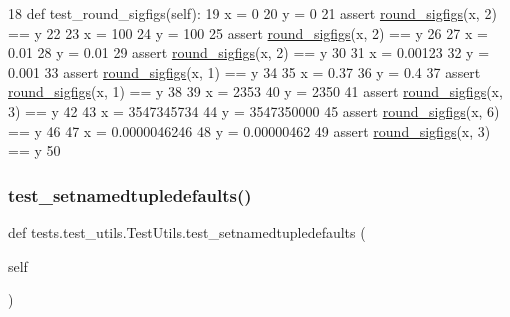 \begin{DoxyCode}
18     \textcolor{keyword}{def }test\_round\_sigfigs(self):
19         x = 0
20         y = 0
21         \textcolor{keyword}{assert} \hyperlink{namespaceparlai_1_1agents_1_1legacy__agents_1_1seq2seq_1_1utils__v0_af377ec61bfc0423461e7b409ffc883b9}{round\_sigfigs}(x, 2) == y
22 
23         x = 100
24         y = 100
25         \textcolor{keyword}{assert} \hyperlink{namespaceparlai_1_1agents_1_1legacy__agents_1_1seq2seq_1_1utils__v0_af377ec61bfc0423461e7b409ffc883b9}{round\_sigfigs}(x, 2) == y
26 
27         x = 0.01
28         y = 0.01
29         \textcolor{keyword}{assert} \hyperlink{namespaceparlai_1_1agents_1_1legacy__agents_1_1seq2seq_1_1utils__v0_af377ec61bfc0423461e7b409ffc883b9}{round\_sigfigs}(x, 2) == y
30 
31         x = 0.00123
32         y = 0.001
33         \textcolor{keyword}{assert} \hyperlink{namespaceparlai_1_1agents_1_1legacy__agents_1_1seq2seq_1_1utils__v0_af377ec61bfc0423461e7b409ffc883b9}{round\_sigfigs}(x, 1) == y
34 
35         x = 0.37
36         y = 0.4
37         \textcolor{keyword}{assert} \hyperlink{namespaceparlai_1_1agents_1_1legacy__agents_1_1seq2seq_1_1utils__v0_af377ec61bfc0423461e7b409ffc883b9}{round\_sigfigs}(x, 1) == y
38 
39         x = 2353
40         y = 2350
41         \textcolor{keyword}{assert} \hyperlink{namespaceparlai_1_1agents_1_1legacy__agents_1_1seq2seq_1_1utils__v0_af377ec61bfc0423461e7b409ffc883b9}{round\_sigfigs}(x, 3) == y
42 
43         x = 3547345734
44         y = 3547350000
45         \textcolor{keyword}{assert} \hyperlink{namespaceparlai_1_1agents_1_1legacy__agents_1_1seq2seq_1_1utils__v0_af377ec61bfc0423461e7b409ffc883b9}{round\_sigfigs}(x, 6) == y
46 
47         x = 0.0000046246
48         y = 0.00000462
49         \textcolor{keyword}{assert} \hyperlink{namespaceparlai_1_1agents_1_1legacy__agents_1_1seq2seq_1_1utils__v0_af377ec61bfc0423461e7b409ffc883b9}{round\_sigfigs}(x, 3) == y
50 
\end{DoxyCode}
\mbox{\label{classtests_1_1test__utils_1_1TestUtils_a211bff449c261cce734e51e3a937d1af}} 
\subsubsection{\texorpdfstring{test\+\_\+setnamedtupledefaults()}{test\_setnamedtupledefaults()}}
{\footnotesize\ttfamily def tests.\+test\+\_\+utils.\+Test\+Utils.\+test\+\_\+setnamedtupledefaults (\begin{DoxyParamCaption}\item[{}]{self }\end{DoxyParamCaption})}



